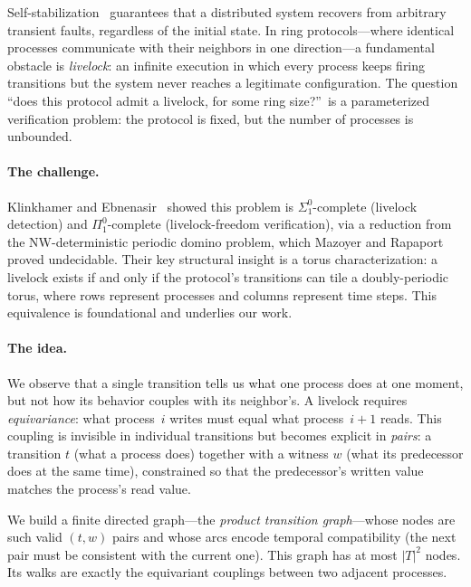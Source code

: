 \documentclass[11pt]{article}
\begin{document}
Self-stabilization~\cite{dijkstra1974} guarantees that a distributed system recovers from arbitrary transient faults, regardless of the initial state. In ring protocols---where identical processes communicate with their neighbors in one direction---a fundamental obstacle is \emph{livelock}: an infinite execution in which every process keeps firing transitions but the system never reaches a legitimate configuration. The question ``does this protocol admit a livelock, for some ring size?''\ is a parameterized verification problem: the protocol is fixed, but the number of processes is unbounded.

\paragraph{The challenge.} Klinkhamer and Ebnenasir~\cite{klinkhamer-ebnenasir} showed this problem is $\Sigma^0_1$-complete (livelock detection) and $\Pi^0_1$-complete (livelock-freedom verification), via a reduction from the NW-deterministic periodic domino problem, which Mazoyer and Rapaport~\cite{mazoyer-rapaport} proved undecidable. Their key structural insight is a torus characterization: a livelock exists if and only if the protocol's transitions can tile a doubly-periodic torus, where rows represent processes and columns represent time steps. This equivalence is foundational and underlies our work.

\paragraph{The idea.} We observe that a single transition tells us what one process does at one moment, but not how its behavior couples with its neighbor's. A livelock requires \emph{equivariance}: what process~$i$ writes must equal what process~$i{+}1$ reads. This coupling is invisible in individual transitions but becomes explicit in \emph{pairs}: a transition $t$ (what a process does) together with a witness $w$ (what its predecessor does at the same time), constrained so that the predecessor's written value matches the process's read value.

We build a finite directed graph---the \emph{product transition graph}---whose nodes are such valid $(t, w)$ pairs and whose arcs encode temporal compatibility (the next pair must be consistent with the current one). This graph has at most $|T|^2$ nodes. Its walks are exactly the equivariant couplings between two adjacent processes.
\end{document}
